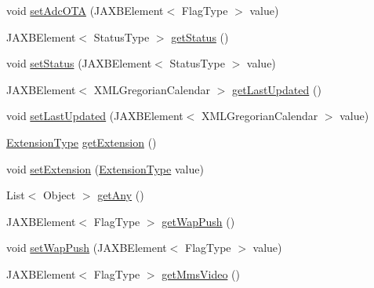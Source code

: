 \begin{DoxyCompactItemize}
\item 
void \hyperlink{classcom_1_1telefonica_1_1schemas_1_1unica_1_1rest_1_1directory_1_1v1_1_1UserTerminalInfoType_a009bf99eb0931fe23887663fab9806a4}{setAdcOTA} (JAXBElement$<$ FlagType $>$ value)
\item 
JAXBElement$<$ StatusType $>$ \hyperlink{classcom_1_1telefonica_1_1schemas_1_1unica_1_1rest_1_1directory_1_1v1_1_1UserTerminalInfoType_a6ec8436835989a04c074035c4cc55a6a}{getStatus} ()
\item 
void \hyperlink{classcom_1_1telefonica_1_1schemas_1_1unica_1_1rest_1_1directory_1_1v1_1_1UserTerminalInfoType_a38bebe8c1733d50f03c35f24a79b37c6}{setStatus} (JAXBElement$<$ StatusType $>$ value)
\item 
JAXBElement$<$ XMLGregorianCalendar $>$ \hyperlink{classcom_1_1telefonica_1_1schemas_1_1unica_1_1rest_1_1directory_1_1v1_1_1UserTerminalInfoType_a047f0cf5e4b399b3fc206753ff707577}{getLastUpdated} ()
\item 
void \hyperlink{classcom_1_1telefonica_1_1schemas_1_1unica_1_1rest_1_1directory_1_1v1_1_1UserTerminalInfoType_a7a83ba70aa47adaf60edb45cdf389348}{setLastUpdated} (JAXBElement$<$ XMLGregorianCalendar $>$ value)
\item 
\hyperlink{classcom_1_1telefonica_1_1schemas_1_1unica_1_1rest_1_1common_1_1v1_1_1ExtensionType}{ExtensionType} \hyperlink{classcom_1_1telefonica_1_1schemas_1_1unica_1_1rest_1_1directory_1_1v1_1_1UserTerminalInfoType_a1b265202c01bdf8a28b3ed4bef031f8f}{getExtension} ()
\item 
void \hyperlink{classcom_1_1telefonica_1_1schemas_1_1unica_1_1rest_1_1directory_1_1v1_1_1UserTerminalInfoType_a553145b7d0e67125c347780576ff62de}{setExtension} (\hyperlink{classcom_1_1telefonica_1_1schemas_1_1unica_1_1rest_1_1common_1_1v1_1_1ExtensionType}{ExtensionType} value)
\item 
List$<$ Object $>$ \hyperlink{classcom_1_1telefonica_1_1schemas_1_1unica_1_1rest_1_1directory_1_1v1_1_1UserTerminalInfoType_abbe6b072986ad3cf23ec954fc7dd5143}{getAny} ()
\item 
JAXBElement$<$ FlagType $>$ \hyperlink{classcom_1_1telefonica_1_1schemas_1_1unica_1_1rest_1_1directory_1_1v1_1_1UserTerminalInfoType_aad92ea05228e36757401a92dafe4bf5e}{getWapPush} ()
\item 
void \hyperlink{classcom_1_1telefonica_1_1schemas_1_1unica_1_1rest_1_1directory_1_1v1_1_1UserTerminalInfoType_abeb3da6569b7d81059b05a925046e578}{setWapPush} (JAXBElement$<$ FlagType $>$ value)
\item 
JAXBElement$<$ FlagType $>$ \hyperlink{classcom_1_1telefonica_1_1schemas_1_1unica_1_1rest_1_1directory_1_1v1_1_1UserTerminalInfoType_aeb31d23eb2ff295c12eb4e459936c1a3}{getMmsVideo} ()

\end{DoxyCompactItemize}
